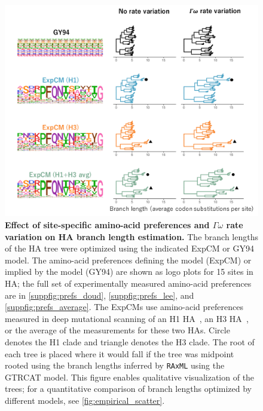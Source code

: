 \documentclass[11pt]{article}
\begin{document}
\newpage
\begin{figure}[h!]
\centerline{\includegraphics[width=\textwidth]{fig4.pdf}}
\caption{\label{fig:empirical_trees}
\textbf{Effect of site-specific amino-acid preferences and $\Gamma\omega$ rate variation on HA branch length estimation.} 
The branch lengths of the HA tree were optimized using the indicated ExpCM or GY94 model. 
The amino-acid preferences defining the model (ExpCM) or implied by the model (GY94) are shown as logo plots for 15 sites in HA; the full set of experimentally measured amino-acid preferences are in \ref{suppfig:prefs_doud}, \ref{suppfig:prefs_lee}, and \ref{suppfig:prefs_average}. 
The ExpCMs use amino-acid preferences measured in deep mutational scanning of an H1 HA~\citep{doud2016accurate}, an H3 HA~\citep{lee2018deep}, or the average of the measurements for these two HAs.
Circle denotes the H1 clade and triangle denotes the H3 clade.
The root of each tree is placed where it would fall if the tree was midpoint rooted using the branch lengths inferred by \texttt{RAxML} using the GTRCAT model. 
This figure enables qualitative visualization of the trees; for a quantitative comparison of branch lengths optimized by different models, see \ref{fig:empirical_scatter}. 
}
\end{figure}
\newpage
\end{document}
